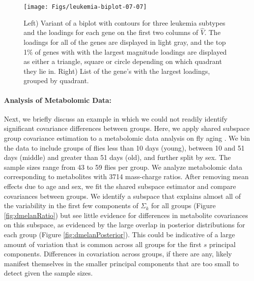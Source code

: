 \documentclass[12pt]{article}
\begin{document}
  \begin{figure}[!ht]
    \centering
    \texttt{[image: Figs/leukemia-biplot-07-07]}
    \qquad
\raisebox{1.25\height}{
\footnotesize

}
\caption{Left) Variant of a biplot with contours for three leukemia
  subtypes and the loadings for each gene on the first two columns of
  $\hat{V}$.  The loadings for all of the genes are displayed in light gray, and the
  top 1\% of genes with with the largest magnitude loadings are
  displayed as either a triangle, square or circle depending on which
  quadrant they lie in.  Right) List of the gene's with the largest
  loadings, grouped by quadrant. }
\label{fig:leukemiaBiplot}
  \end{figure}

\paragraph{Analysis of Metabolomic Data:}

Next, we briefly discuss an example in which we could not readily
identify significant covariance differences between groups.  Here, we
apply shared subspace group covariance estimation to a metabolomic
data analysis on fly aging \citep{Hoffman2014}.  We bin the data to
include groups of flies less than 10 days (young), between 10 and 51
days (middle) and greater than 51 days (old), and further split by
sex. The sample sizes range from 43 to 59 flies per group.  We analyze
metabolomic data corresponding to metabolites with 3714 mass-charge
ratios.  After removing mean effects due to age and sex, we fit the
shared subspace estimator and compare covariances between groups.  We
identify a subspace that explains almost all of the variability in the
first few components of $\Sigma_k$ for all groups (Figure
\ref{fig:dmelanRatio}) but see little evidence for differences in
metabolite covariances on this subspace, as evidenced by the large
overlap in posterior distributions for each group (Figure
\ref{fig:dmelanPosterior}). This could be indicative of a large amount
of variation that is common across all groups for the first $s$
principal components. Differences in covariation across groups, if
there are any, likely manifest themselves in the smaller principal
components that are too small to detect given the sample sizes.
\end{document}
